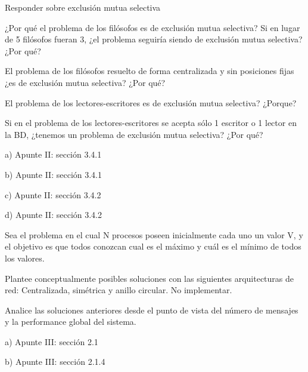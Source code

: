 \documentclass[a4paper, 10pt]{article}
\newenvironment{main_question}
	{\noindent\begin{enumerate}[resume=series-name]\bfseries}
	{\end{enumerate}}
\newenvironment{sub_questions}
	{\noindent\begin{enumerate}[label=\emph{\alph*}), leftmargin=0cm]}
	{\end{enumerate}}
\newenvironment{answer}
	{\noindent\par\normalfont}
	{}
\begin{document}
\begin{main_question}
\item Responder sobre exclusión mutua selectiva
\begin{sub_questions}
	\item ¿Por qué el problema de los filósofos es de exclusión mutua selectiva? Si en lugar de 5 filósofos fueran 3, ¿el problema seguiría siendo de exclusión mutua selectiva? ¿Por qué?
	\item El problema de los filósofos resuelto de forma centralizada y sin posiciones fijas ¿es de exclusión mutua selectiva? ¿Por qué?
	\item El problema de los lectores-escritores es de exclusión mutua selectiva? ¿Porque?
	\item Si en el problema de los lectores-escritores se acepta sólo 1 escritor  o 1 lector en la BD, ¿tenemos un problema de exclusión mutua selectiva?  ¿Por qué?
\end{sub_questions}
\end{main_question}
\begin{answer}
a) Apunte II: sección 3.4.1

b) Apunte II: sección 3.4.1

c) Apunte II: sección 3.4.2

d) Apunte II: sección 3.4.2
\end{answer}
\begin{main_question}
\item Sea el problema en el cual N procesos poseen inicialmente cada uno un valor V, y el objetivo es que todos conozcan cual es el máximo y cuál es el mínimo de todos los valores.
\begin{sub_questions}
	\item Plantee conceptualmente posibles soluciones con las siguientes arquitecturas de red: Centralizada, simétrica y anillo circular. No implementar.
	\item Analice las soluciones anteriores desde el punto de vista del número de mensajes y la performance global del sistema.
\end{sub_questions}
\end{main_question}
\begin{answer}
a) Apunte III: sección 2.1

b) Apunte III: sección 2.1.4
\end{answer}
\end{document}
